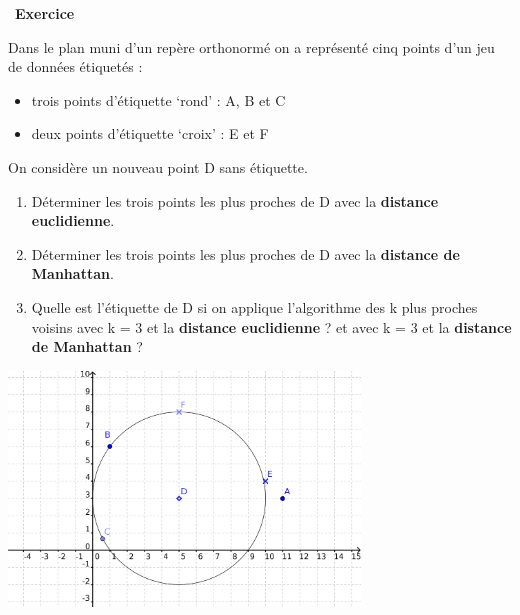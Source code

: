 \documentclass[
  11pt,
]{article}
\providecommand{\tightlist}{%
  \setlength{\itemsep}{0pt}\setlength{\parskip}{0pt}}
\newcounter{exo}
\newenvironment{exercice}[1]
{\par \medskip   \addtocounter{exo}{1} \noindent  
\begin{bclogo}[arrondi =0.1,   noborder = true, logo=\bccrayon, marge=4]{~\textbf{Exercice} \textbf{\theexo} {\itshape #1} }  \par}
{
\end{bclogo}
 \par \bigskip }
\newcounter{thme}
\newcounter{def}
\newcounter{alg}
\begin{document}
\begin{exercice}{}

Dans le plan muni d'un repère orthonormé on a représenté cinq points
d'un jeu de données étiquetés :

\begin{itemize}
\tightlist
\item
  trois points d'étiquette `rond' : A, B et C
\item
  deux points d'étiquette `croix' : E et F
\end{itemize}

On considère un nouveau point D sans étiquette.

\begin{enumerate}
\def\labelenumi{\arabic{enumi}.}
\tightlist
\item
  Déterminer les trois points les plus proches de D avec la
  \textbf{distance euclidienne}.
\item
  Déterminer les trois points les plus proches de D avec la
  \textbf{distance de Manhattan}.
\item
  Quelle est l'étiquette de D si on applique l'algorithme des k plus
  proches voisins avec k = 3 et la \textbf{distance euclidienne} ? et
  avec k = 3 et la \textbf{distance de Manhattan} ?
\end{enumerate}

\includegraphics[width=0.7\textwidth,height=\textheight]{images/distances.png}\\

\end{exercice}
\end{document}
